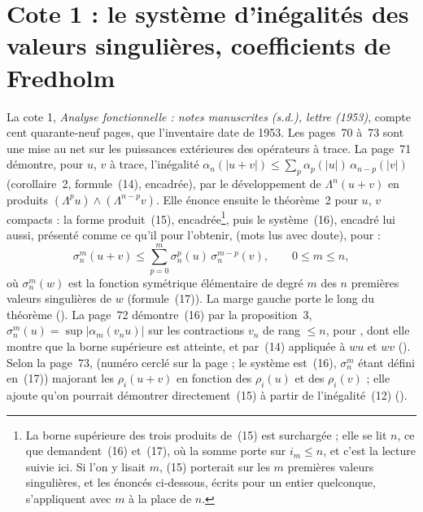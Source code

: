 \section[Cote 1 : le système d'inégalités des valeurs singulières, coefficients de Fredholm]{Cote 1 : le système d'inégalités des valeurs singulières, coefficients de Fredholm\protect{}}\label{sec:1}

La cote 1, \emph{Analyse fonctionnelle : notes manuscrites (s.d.), lettre (1953)}, compte cent quarante-neuf pages, que l'inventaire date de 1953. Les pages~70 à~73 sont une mise au net sur les puissances extérieures des opérateurs à trace. La page~71 démontre, pour $u$, $v$ à trace, l'inégalité $\alpha_n(|u+v|) \leq \sum_{p} \alpha_p(|u|)\,\alpha_{n-p}(|v|)$ (corollaire~2, formule~(14), encadrée), par le développement de $\Lambda^n(u+v)$ en produits $(\Lambda^p u) \wedge (\Lambda^{n-p} v)$. Elle énonce ensuite le théorème~2 pour $u$, $v$ compacts : la forme produit~(15), encadrée\footnote{La borne supérieure des trois produits de~(15) est surchargée ; elle se lit $n$, ce que demandent~(16) et~(17), où la somme porte sur $i_m \leq n$, et c'est la lecture suivie ici. Si l'on y lisait $m$, (15) porterait sur les $m$ premières valeurs singulières, et les énoncés ci-dessous, écrits pour un entier quelconque, s'appliquent avec $m$ à la place de $n$.}, puis le système~(16), encadré lui aussi, présenté comme ce qu'il  pour l'obtenir,  (mots lus avec doute), pour  :
\[
  \sigma_n^m(u+v) \leq \sum_{p=0}^{m} \sigma_n^p(u)\,\sigma_n^{m-p}(v), \qquad 0 \leq m \leq n,
\]
où $\sigma_n^m(w)$ est la fonction symétrique élémentaire de degré $m$ des $n$ premières valeurs singulières de $w$ (formule~(17)). La marge gauche porte  le long du théorème (). La page~72 démontre~(16) par la proposition~3, $\sigma_n^m(u) = \sup |\alpha_m(v_n u)|$ sur les contractions $v_n$ de rang $\leq n$, pour , dont elle montre que la borne supérieure est atteinte, et par~(14) appliquée à $wu$ et $wv$ (). Selon la page~73,  (numéro cerclé sur la page ; le système est~(16), $\sigma_n^m$ étant défini en~(17))  majorant les $\rho_i(u+v)$ en fonction des $\rho_i(u)$ et des $\rho_i(v)$ ; elle ajoute qu'on pourrait démontrer directement~(15) à partir de l'inégalité~(12)  ().


